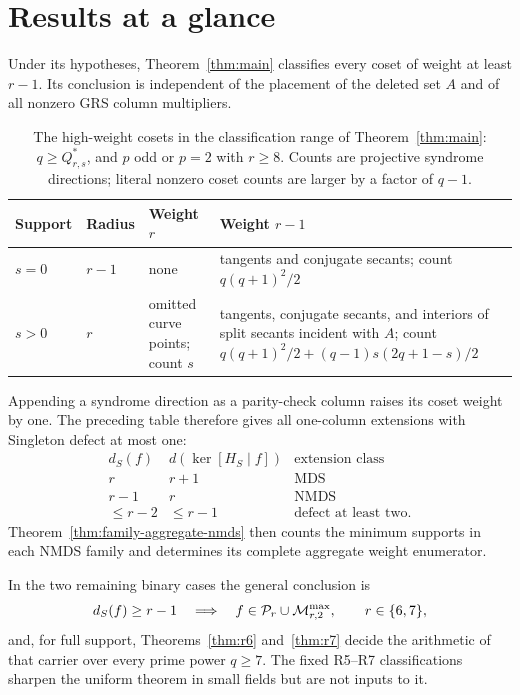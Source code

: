 \section{Results at a glance}
\label{sec:results-map}

Under its hypotheses, Theorem~\ref{thm:main} classifies every coset of
weight at least \(r-1\).
Its conclusion is independent of the placement of the deleted set \(A\) and
of all nonzero GRS column multipliers.

\begin{table}[H]
\centering
\small
\caption{The high-weight cosets in the classification range of
Theorem~\ref{thm:main}: \(q\geq Q^*_{r,s}\), and \(p\) odd or \(p=2\)
with \(r\geq8\).  Counts are projective syndrome directions;
literal nonzero coset counts are larger by a factor of \(q-1\).}
\label{tab:headline-shells}
\setlength{\tabcolsep}{5pt}
\begin{tabular}{p{}p{}p{}
                p{}}
\toprule
Support & Radius & Weight \(r\) & Weight \(r-1\)\\
\midrule
\(s=0\) & \(r-1\) & none & tangents and conjugate secants;
count \(q(q+1)^2/2\)\\
\(s>0\) & \(r\) & omitted curve points; count \(s\) & tangents,
conjugate secants, and interiors of split secants incident with \(A\);
count \(q(q+1)^2/2+(q-1)s(2q+1-s)/2\)\\
\bottomrule
\end{tabular}
\end{table}

Appending a syndrome direction as a parity-check column raises its coset
weight by one.  The preceding table therefore gives all one-column
extensions with Singleton defect at most one:
\[
\begin{array}{c|c|c}
d_S(f)&d(\ker[H_S\mid f])&\text{extension class}\\ \hline
r&r+1&\text{MDS}\\
r-1&r&\text{NMDS}\\
\leq r-2&\leq r-1&\text{defect at least two}.
\end{array}
\]
Theorem~\ref{thm:family-aggregate-nmds} then counts the minimum supports in
each NMDS family and determines its complete aggregate weight enumerator.

In the two remaining binary cases the general conclusion is
\[
 d_S(f)\geq r-1
 \quad\Longrightarrow\quad
 f\in\mathcal P_r\cup\mathcal M^{\max}_{r,2},\qquad r\in\{6,7\},
\]
and, for full support, Theorems~\ref{thm:r6} and~\ref{thm:r7} decide the
arithmetic of that carrier over every prime power \(q\geq7\).  The fixed R5--R7 classifications
sharpen the uniform theorem in small fields but are not inputs to it.

